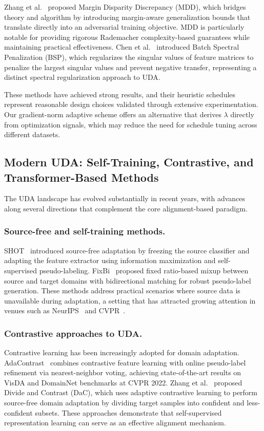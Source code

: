 \documentclass[pdflatex,sn-mathphys-num]{sn-jnl}
\theoremstyle{thmstyleone}
\theoremstyle{thmstyletwo}
\theoremstyle{thmstylethree}
\begin{document}
Zhang et al.~\cite{zhang2019mdd} proposed Margin Disparity Discrepancy (MDD), which bridges theory and algorithm by introducing margin-aware generalization bounds that translate directly into an adversarial training objective. MDD is particularly notable for providing rigorous Rademacher complexity-based guarantees while maintaining practical effectiveness. Chen et al.~\cite{chen2019bsp} introduced Batch Spectral Penalization (BSP), which regularizes the singular values of feature matrices to penalize the largest singular values and prevent negative transfer, representing a distinct spectral regularization approach to UDA.

These methods have achieved strong results, and their heuristic schedules represent reasonable design choices validated through extensive experimentation. Our gradient-norm adaptive scheme offers an alternative that derives $\lambda$ directly from optimization signals, which may reduce the need for schedule tuning across different datasets.

\subsection{Modern UDA: Self-Training, Contrastive, and Transformer-Based Methods}

The UDA landscape has evolved substantially in recent years, with advances along several directions that complement the core alignment-based paradigm.

\subsubsection{Source-free and self-training methods.}
SHOT~\cite{liang2020shot} introduced source-free adaptation by freezing the source classifier and adapting the feature extractor using information maximization and self-supervised pseudo-labeling. FixBi~\cite{na2021fixbi} proposed fixed ratio-based mixup between source and target domains with bidirectional matching for robust pseudo-label generation. These methods address practical scenarios where source data is unavailable during adaptation, a setting that has attracted growing attention in venues such as NeurIPS~\cite{liang2020shot} and CVPR~\cite{na2021fixbi}.

\subsubsection{Contrastive approaches to UDA.}
Contrastive learning has been increasingly adopted for domain adaptation. AdaContrast~\cite{chen2022contrastive} combines contrastive feature learning with online pseudo-label refinement via nearest-neighbor voting, achieving state-of-the-art results on VisDA and DomainNet benchmarks at CVPR 2022. Zhang et al.~\cite{zhang2022dac} proposed Divide and Contrast (DaC), which uses adaptive contrastive learning to perform source-free domain adaptation by dividing target samples into confident and less-confident subsets. These approaches demonstrate that self-supervised representation learning can serve as an effective alignment mechanism.
\end{document}
